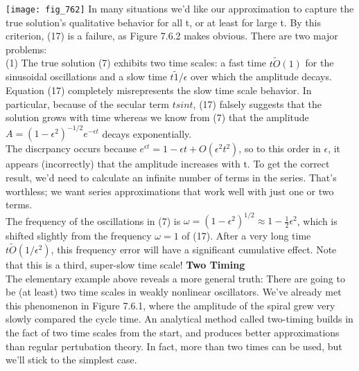 \documentclass{article}
\newcommand\tab[1][1cm]{\hspace*{#1}}
\begin{document}
\texttt{[image: fig\_762]}
\tab In many situations we'd like our approximation to capture the true solution's qualitative behavior for all t, or at least for large t. By this criterion, (17) is a failure, as Figure 7.6.2 makes obvious. There are two major problems: \\ \tab
(1) The true solution (7) exhibits two time scales: a fast time $t \tilde O(1)$ for the sinusoidal oscillations and a slow time $t \tilde 1/\epsilon$ over which the amplitude decays. Equation (17) completely misrepresents the slow time scale behavior. In particular, because of the secular term $t sin t$, (17) falsely suggests that the solution grows with time whereas we know from (7) that the amplitude $A=(1-\epsilon^{2})^{-1/2}e^{-\epsilon t}$ decays exponentially. \\
\tab
The discrpancy occurs because $e^{\epsilon t}=1-\epsilon t + O(\epsilon^{2}t^{2})$, so to this order in $\epsilon$, it appears (incorrectly) that the amplitude increases with t. To get the correct result, we'd need to calculate an infinite number of terms in the series. That's worthless; we want series approximations that work well with just one or two terms. \\
The frequency of the oscillations in (7) is $\omega=(1-\epsilon^{2})^{1/2} \approx 1-\frac{1}{2}\epsilon^{2}$, which is shifted slightly from the frequency $\omega = 1$ of (17). After a very long time $t \tilde O(1/\epsilon^{2})$, this frequency error will have a significant cumulative effect. Note that this is a third, super-slow time scale! 
\textbf {Two Timing} \\ \tab
The elementary example above reveals a more general truth: There are going to be (at least) two time scales in weakly nonlinear oscillators. We've already met this phenomenon in Figure 7.6.1, where the amplitude of the spiral grew very slowly compared the cycle time. An analytical method called two-timing builds in the fact of two time scales from the start, and produces better approximations than regular pertubation theory. In fact, more than two times can be used, but we'll stick to the simplest case. \\
\end{document}
